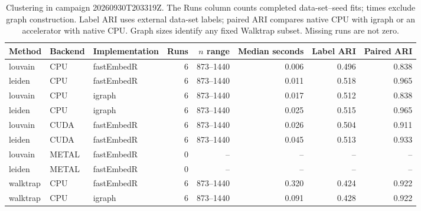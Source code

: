 \begin{table}[htbp]
\centering
\caption{Clustering in campaign 20260930T203319Z. The Runs column counts completed data-set--seed fits; times exclude graph construction. Label ARI uses external data-set labels; paired ARI compares native CPU with igraph or an accelerator with native CPU. Graph sizes identify any fixed Walktrap subset. Missing runs are not zero.}
\label{tab:diagnostic-clustering}
\scriptsize
\begin{tabular}{lllrrrrr}
\toprule
Method & Backend & Implementation & Runs & $n$ range & Median seconds & Label ARI & Paired ARI \\
\midrule
louvain & CPU & fastEmbedR & 6 & 873--1440 & 0.006 & 0.496 & 0.838 \\
leiden & CPU & fastEmbedR & 6 & 873--1440 & 0.011 & 0.518 & 0.965 \\
louvain & CPU & igraph & 6 & 873--1440 & 0.017 & 0.512 & 0.838 \\
leiden & CPU & igraph & 6 & 873--1440 & 0.025 & 0.515 & 0.965 \\
louvain & CUDA & fastEmbedR & 6 & 873--1440 & 0.026 & 0.504 & 0.911 \\
leiden & CUDA & fastEmbedR & 6 & 873--1440 & 0.045 & 0.513 & 0.933 \\
louvain & METAL & fastEmbedR & 0 & -- & -- & -- & -- \\
leiden & METAL & fastEmbedR & 0 & -- & -- & -- & -- \\
walktrap & CPU & fastEmbedR & 6 & 873--1440 & 0.320 & 0.424 & 0.922 \\
walktrap & CPU & igraph & 6 & 873--1440 & 0.091 & 0.428 & 0.922 \\
\bottomrule
\end{tabular}
\end{table}
